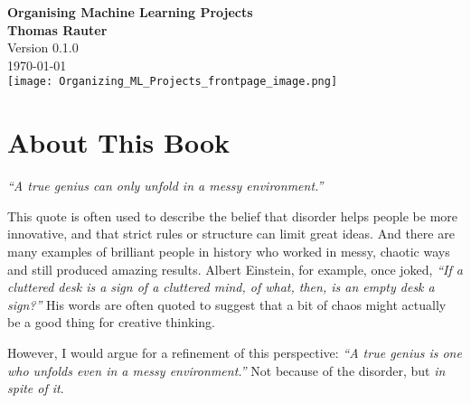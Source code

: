 \documentclass[12pt,openany]{book}
\begin{document}
\begin{titlepage}
    \centering
    \newpage
    \thispagestyle{empty}
    
    
    \vspace*{2cm}
    {\LARGE \textbf{\textcolor{darknavy}{Organising Machine Learning Projects}}} \\

    \vspace{2cm}
    \Large{\textcolor{darknavy}{\textbf{Thomas Rauter}}} \\

    \vspace{0.5cm}
    \large{\textcolor{darknavy}{Version 0.1.0}} \\
    \large{\textcolor{darknavy}{\today}} \\

    \vspace{1.5cm}
    \texttt{[image: Organizing\_ML\_Projects\_frontpage\_image.png]}

\end{titlepage}



\chapter*{About This Book}

\noindent
\textit{“A true genius can only unfold in a messy environment.”}

\vspace{1em}

This quote is often used to describe the belief that disorder helps people be more innovative, and that strict rules or structure can limit great ideas. And there are many examples of brilliant people in history who worked in messy, chaotic ways and still produced amazing results. Albert Einstein, for example, once joked, \textit{“If a cluttered desk is a sign of a cluttered mind, of what, then, is an empty desk a sign?”} His words are often quoted to suggest that a bit of chaos might actually be a good thing for creative thinking. \newline

However, I would argue for a refinement of this perspective:
\textit{“A true genius is one who unfolds even in a messy environment.”} Not because of the disorder, but \textit{in spite of it}. \newline
\end{document}
